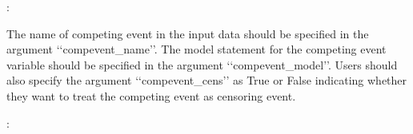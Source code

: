 \documentclass[letterpaper,10pt,english]{sphinxmanual}
\begin{document}
\sphinxAtStartPar
{}:

\begin{sphinxVerbatim}[commandchars=\\\{\}]
  
  
  

            
\end{sphinxVerbatim}

\sphinxAtStartPar
The name of competing event in the input data should be specified in the argument ‘‘compevent\_name’’.
The model statement for the competing event variable should be specified in the argument ‘‘compevent\_model’’.
Users should also specify the argument ‘‘compevent\_cens’’ as True or False indicating whether they want to treat the competing
event as censoring event.

\sphinxAtStartPar
{} :
\end{document}
